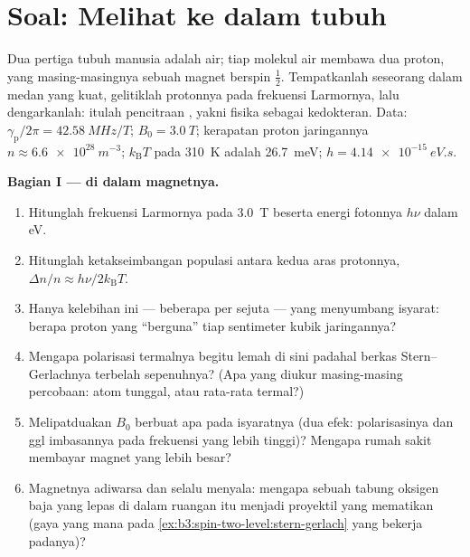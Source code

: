 \section{Soal: Melihat ke dalam tubuh}

\begin{problem}\label{pb:b3:spin-two-level:1}
Dua pertiga tubuh manusia adalah air; tiap molekul air membawa dua
proton, yang masing-masingnya sebuah magnet berspin $\tfrac12$.
Tempatkanlah seseorang dalam medan yang kuat, gelitiklah protonnya pada
frekuensi Larmornya, lalu dengarkanlah: itulah pencitraan , yakni fisika  sebagai kedokteran. Data:
$\gamma_{\text{p}}/2\pi = \qty{42.58}{MHz/T}$; $B_0 = \qty{3.0}{T}$;
kerapatan proton jaringannya $n \approx \qty{6.6e28}{m^{-3}}$;
$k_{\text{B}}T$ pada \qty{310}{K} adalah \qty{26.7}{meV}; $h =
\qty{4.14e-15}{eV.s}$.

\medskip\noindent\textbf{Bagian I ---  di dalam magnetnya.}
\begin{enumerate}
  \item Hitunglah frekuensi Larmornya pada \qty{3.0}{T} beserta energi
        fotonnya $h\nu$ dalam eV.
  \item Hitunglah ketakseimbangan populasi antara kedua aras protonnya,
        $\Delta n/n \approx h\nu/2k_{\text{B}}T$.
  \item Hanya kelebihan ini --- beberapa per sejuta --- yang menyumbang
        isyarat: berapa proton yang ``berguna'' tiap sentimeter kubik
        jaringannya?
  \item Mengapa polarisasi termalnya begitu lemah di sini padahal berkas
        Stern--Gerlachnya terbelah sepenuhnya? (Apa yang diukur
        masing-masing percobaan:  atom tunggal, atau
        rata-rata termal?)
  \item Melipatduakan $B_0$ berbuat apa pada isyaratnya (dua efek:
        polarisasinya dan ggl imbasannya pada frekuensi yang lebih
        tinggi)? Mengapa rumah sakit membayar magnet yang lebih besar?
  \item Magnetnya adiwarsa dan selalu menyala: mengapa sebuah tabung
        oksigen baja yang lepas di dalam ruangan itu menjadi proyektil
        yang mematikan (gaya yang mana pada
        \cref{ex:b3:spin-two-level:stern-gerlach} yang bekerja padanya)?
\end{enumerate}


\end{problem}
